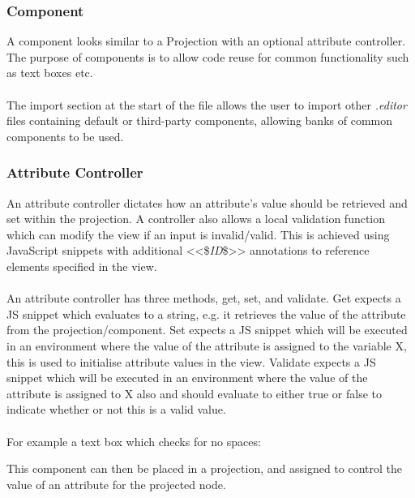 \documentclass{article}
\begin{document}
{\subsubsection{Component}


A component looks similar to a Projection with an optional attribute controller. The purpose of components is to allow code reuse for common functionality such as text boxes etc.
\\
\\
The import section at the start of the file allows the user to import other \emph{.editor} files containing default or third-party components, allowing banks of common components to be used.

\subsubsection{Attribute Controller}

An attribute controller dictates how an attribute's value should be retrieved and set within the projection. A controller also allows a local validation function which can modify the view if an input is invalid/valid. This is achieved using JavaScript snippets with additional <<\$\emph{ID}\$>> annotations to reference elements specified in the view.
\\
\\
An attribute controller has three methods, get, set, and validate. Get expects a JS snippet which evaluates to a string, e.g. it retrieves the value of the attribute from the projection/component. Set expects a JS snippet which will be executed in an environment where the value of the attribute is assigned to the variable X, this is used to initialise attribute values in the view. Validate expects a JS snippet which will be executed in an environment where the value of the attribute is assigned to X also and should evaluate to either true or false to indicate whether or not this is a valid value. 
\\
\\
For example a text box which checks for no spaces: 

This component can then be placed in a projection, and assigned to control the value of an attribute for the projected node.

}
\end{document}
